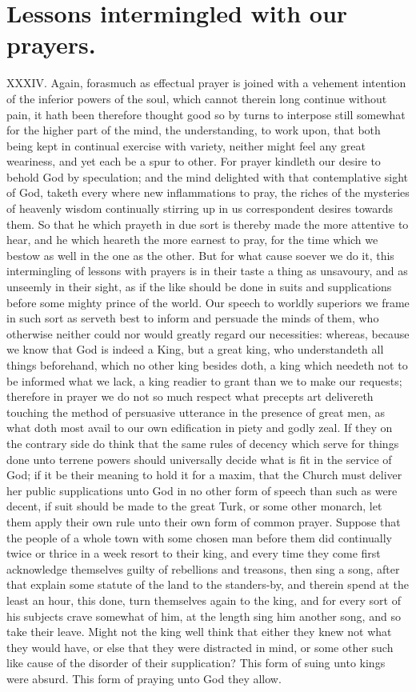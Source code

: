\section*{Lessons intermingled with our prayers.}
XXXIV. Again, forasmuch as effectual prayer is joined with a vehement intention of the inferior powers of the soul, which cannot therein long continue without pain, it hath been therefore thought good so by turns to interpose still somewhat for the higher part of the mind, the understanding, to work upon, that both being kept in continual exercise with variety, neither might feel any great weariness, and yet each be a spur to other. For prayer kindleth our desire to behold God by speculation; and the mind delighted with that contemplative sight of God, taketh every where new inflammations to pray, the riches of the mysteries of heavenly wisdom continually stirring up in us correspondent desires towards them. So that he which prayeth in due sort is thereby made the more attentive to hear, and he which heareth the more earnest to pray, for the time which we bestow as well in the one as the other.
But for what cause soever we do it, this intermingling of lessons with prayers is in their taste a thing as unsavoury, and as unseemly in their sight, as if the like should be done in suits and supplications before some mighty prince of the world. Our speech to worldly superiors we frame in such sort as serveth best to inform and persuade the minds of them, who otherwise neither could nor would greatly regard our necessities: whereas, because we know that God is indeed a King, but a great king, who understandeth all things beforehand, which no other king besides doth, a king which needeth not to be informed what we lack, a king readier to grant than we to make our requests; therefore in prayer we do not so much respect what precepts art delivereth touching the method of persuasive utterance in the presence of great men, as what doth most avail to our own edification in piety and godly zeal. If they on the contrary side do think that the same rules of decency which serve for things done unto terrene powers should universally decide what is fit in the service of God; if it be their meaning to hold it for a maxim, that the Church must deliver her public supplications unto God in no other form of speech than such as were decent, if suit should be made to the great Turk, or some other monarch, let them apply their own rule unto their own form of common prayer. Suppose that the people of a whole town with some chosen man before them did continually twice or thrice in a week resort to their king, and every time they come first acknowledge themselves guilty of rebellions and treasons, then sing a song, after that explain some statute of the land to the standers-by, and therein  spend at the least an hour, this done, turn themselves again to the king, and for every sort of his subjects crave somewhat of him, at the length sing him another song, and so take their leave. Might not the king well think that either they knew not what they would have, or else that they were distracted in mind, or some other such like cause of the disorder of their supplication? This form of suing unto kings were absurd. This form of praying unto God they allow.
